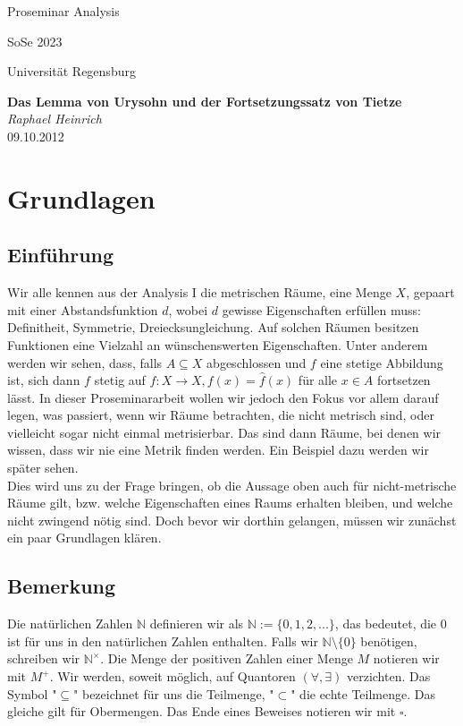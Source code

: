 \documentclass[11pt,leqno]{article}
\newcommand{\N}{\mathbb{N}}
\begin{document}
\noindent \small Proseminar Analysis

\vspace{-1cm}
\begin{flushright}SoSe 2023

Universit\"at Regensburg
\end{flushright}
\normalsize
\vspace{0.2cm}
\begin{center}
{\bf \Large Das Lemma von Urysohn und der Fortsetzungssatz von Tietze}\\[0.3cm]
{\it Raphael Heinrich}\\[0.2cm]
{09.10.2012}\\[0.4cm]
\end{center}

\section{Grundlagen}
\subsection{Einführung}
Wir alle kennen aus der Analysis I die metrischen Räume, eine Menge $X$, gepaart mit einer Abstandsfunktion $d$, wobei $d$ gewisse 
Eigenschaften erfüllen muss: Definitheit, Symmetrie, Dreiecksungleichung. Auf solchen Räumen besitzen Funktionen eine Vielzahl an 
wünschenswerten Eigenschaften. Unter anderem werden wir sehen, dass, falls $A \subseteq X$ abgeschlossen und $f$ eine stetige Abbildung 
ist, sich dann $f$ stetig auf $\hat{f}:X \xrightarrow{} X, f(x)=\hat{f}(x)$ für alle $x \in A$ fortsetzen lässt. In dieser Proseminararbeit 
wollen wir jedoch den Fokus vor allem darauf legen, was passiert, wenn wir Räume betrachten, die nicht metrisch sind, oder vielleicht sogar nicht
einmal metrisierbar. Das sind dann Räume, bei denen wir wissen, dass wir nie eine Metrik finden werden. Ein Beispiel dazu werden wir später sehen.\\
Dies wird uns zu der Frage bringen, ob die Aussage oben auch für nicht-metrische Räume gilt, bzw. welche Eigenschaften eines Raums 
erhalten bleiben, und welche nicht zwingend nötig sind. Doch bevor wir dorthin gelangen, müssen wir zunächst ein paar Grundlagen klären.

\subsection{Bemerkung}
Die natürlichen Zahlen $\N$ definieren wir als $\N := \{0,1,2, ... \}$, das bedeutet, die 0 ist für uns in den natürlichen Zahlen enthalten. 
Falls wir $\N \setminus \{0\}$ benötigen, schreiben wir $\N^\times$. Die Menge der positiven Zahlen einer Menge $M$ notieren wir mit $M^{+}$.
Wir werden, soweit möglich, auf Quantoren $(\forall, \exists)$ verzichten. Das Symbol "$\subseteq$" bezeichnet für uns die Teilmenge, 
"$\subset$" die echte Teilmenge. Das gleiche gilt für Obermengen.
Das Ende eines Beweises notieren wir mit $\square$.
\end{document}

